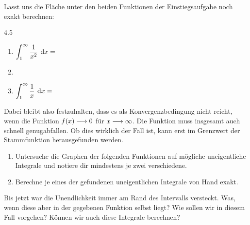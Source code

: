 	\begin{beispiel}
		Lasst uns die Fläche unter den beiden Funktionen der Einstiegsaufgabe noch exakt berechnen:
		\begin{gridspace}{4.5}
			\begin{enumerate}[label=\ ]\vspace{-2.5mm}
				\item $\displaystyle\int_{1}^{\infty}\frac{1}{x^2}\:\operatorname{d}\!{x}=$
				\item
				\item $\displaystyle\int_{1}^{\infty}\frac{1}{x}\:\operatorname{d}\!{x}=$
			\end{enumerate}
		\end{gridspace}
	\end{beispiel}
	\begin{satz}
		Dabei bleibt also festzuhalten, dass es als Konvergenzbedingung nicht reicht, wenn die Funktion $f(x)\longrightarrow 0$ für $x\longrightarrow\infty$. Die Funktion muss insgesamt auch \flqq schnell genug\frqq\:abfallen. Ob dies wirklich der Fall ist, kann erst im Grenzwert der Stammfunktion herausgefunden werden.
	\end{satz}
	\begin{aufgabe}
		\begin{enumerate}
			\item Untersuche die Graphen der folgenden Funktionen auf mögliche uneigentliche Integrale und notiere dir mindestens je zwei verschiedene.
			\item Berechne je eines der gefundenen uneigentlichen Integrale von Hand exakt.
		\end{enumerate}
	\end{aufgabe}
	Bis jetzt war die Unendlichkeit immer am Rand des Intervalls versteckt. Was, wenn diese aber in der gegebenen Funktion selbst liegt? Wie sollen wir in diesem Fall vorgehen? Können wir auch diese Integrale berechnen?

